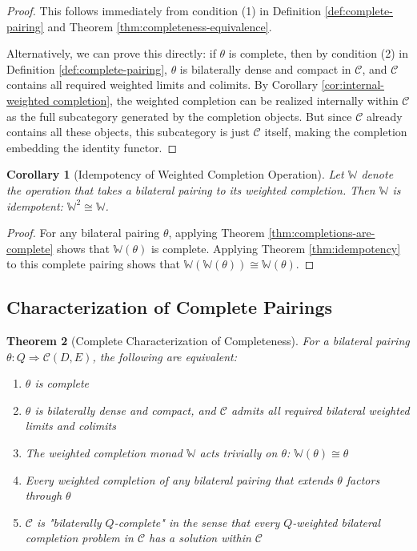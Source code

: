 \documentclass[11pt]{article}
\theoremstyle{plain}
\newtheorem{theorem}{Theorem}[section]
\newtheorem{corollary}[theorem]{Corollary}
\theoremstyle{definition}
\theoremstyle{remark}
\newcommand{\C}{\mathcal{C}}
\begin{document}
\begin{proof}
This follows immediately from condition (1) in Definition \ref{def:complete-pairing} and Theorem \ref{thm:completeness-equivalence}.

Alternatively, we can prove this directly: if $\theta$ is complete, then by condition (2) in Definition \ref{def:complete-pairing}, $\theta$ is bilaterally dense and compact in $\C$, and $\C$ contains all required weighted limits and colimits. By Corollary \ref{cor:internal-weighted completion}, the weighted completion can be realized internally within $\C$ as the full subcategory generated by the completion objects. But since $\C$ already contains all these objects, this subcategory is just $\C$ itself, making the completion embedding the identity functor.
\end{proof}

\begin{corollary}[Idempotency of Weighted Completion Operation]\label{cor:operation-idempotency}
Let $\mathbb{W}$ denote the operation that takes a bilateral pairing to its weighted completion. Then $\mathbb{W}$ is idempotent: $\mathbb{W}^2 \cong \mathbb{W}$.
\end{corollary}

\begin{proof}
For any bilateral pairing $\theta$, applying Theorem \ref{thm:completions-are-complete} shows that $\mathbb{W}(\theta)$ is complete. Applying Theorem \ref{thm:idempotency} to this complete pairing shows that $\mathbb{W}(\mathbb{W}(\theta)) \cong \mathbb{W}(\theta)$.
\end{proof}

\subsection{Characterization of Complete Pairings}

\begin{theorem}[Complete Characterization of Completeness]\label{thm:complete-characterization}
For a bilateral pairing $\theta : Q \Rightarrow \C(D, E)$, the following are equivalent:

\begin{enumerate}
\item $\theta$ is complete
\item $\theta$ is bilaterally dense and compact, and $\C$ admits all required bilateral weighted limits and colimits
\item The weighted completion monad $\mathbb{W}$ acts trivially on $\theta$: $\mathbb{W}(\theta) \cong \theta$
\item Every weighted completion of any bilateral pairing that extends $\theta$ factors through $\theta$
\item $\C$ is "bilaterally $Q$-complete" in the sense that every $Q$-weighted bilateral completion problem in $\C$ has a solution within $\C$
\end{enumerate}
\end{theorem}
\end{document}
